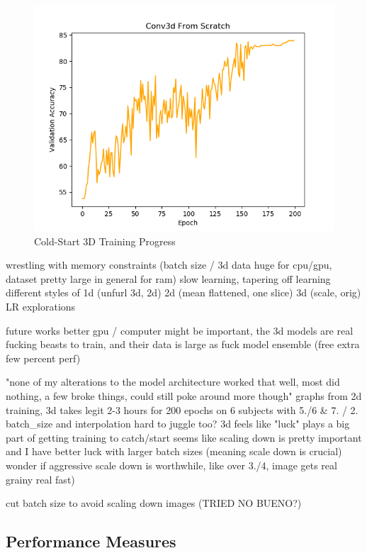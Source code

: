  \begin{figure}
  \includegraphics[width=\linewidth]{images/3d_cold.png}
  \caption{Cold-Start 3D Training Progress}
  \label{fig:3d_cold}
\end{figure}
wrestling with memory constraints (batch size / 3d data huge for cpu/gpu, dataset pretty large in general for ram) slow learning, tapering off learning
different styles of 1d (unfurl 3d, 2d) 2d (mean flattened, one slice) 3d (scale, orig)
LR explorations

future works
better gpu / computer might be important, the 3d models are real fucking beasts to train, and their data is large as fuck
model ensemble (free extra few percent perf)



"none of my alterations to the model architecture worked that well, most did nothing, a few broke things, could still poke around more though"
graphs from 2d training, 3d takes legit 2-3 hours for 200 epochs on 6 subjects with 5./6 & 7. / 2.
batch_size and interpolation hard to juggle too?
3d feels like "luck" plays a big part of getting training to catch/start
seems like scaling down is pretty important and I have better luck with larger batch sizes (meaning scale down is crucial) wonder if aggressive scale down is worthwhile, like over 3./4, image gets real grainy real fast)

cut batch size to avoid scaling down images (TRIED NO BUENO?)

\subsection{Performance Measures}\label{subsec:performance}

